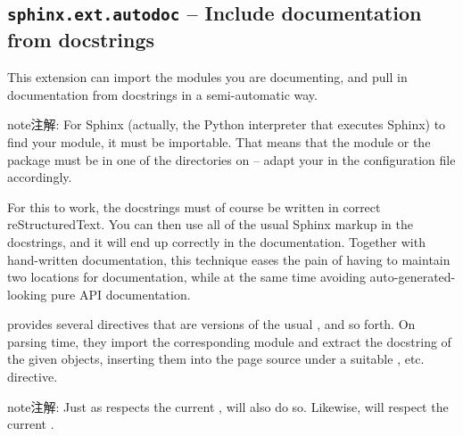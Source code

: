 \documentclass[letterpaper,10pt,english]{sphinxmanual}
\begin{document}
\subsection{\texttt{sphinx.ext.autodoc} -- Include documentation from docstrings}
\label{ext/autodoc::doc}\label{ext/autodoc:module-sphinx.ext.autodoc}\label{ext/autodoc:sphinx-ext-autodoc-include-documentation-from-docstrings}
This extension can import the modules you are documenting, and pull in
documentation from docstrings in a semi-automatic way.

\begin{notice}{note}{注解:}
For Sphinx (actually, the Python interpreter that executes Sphinx) to find
your module, it must be importable.  That means that the module or the
package must be in one of the directories on  -- adapt your
 in the configuration file accordingly.
\end{notice}

For this to work, the docstrings must of course be written in correct
reStructuredText.  You can then use all of the usual Sphinx markup in the
docstrings, and it will end up correctly in the documentation.  Together with
hand-written documentation, this technique eases the pain of having to maintain
two locations for documentation, while at the same time avoiding
auto-generated-looking pure API documentation.

 provides several directives that are versions of the usual
{\hyperref[domains:directive\string-py:module]{}}, {\hyperref[domains:directive\string-py:class]{}} and so forth.  On parsing time, they
import the corresponding module and extract the docstring of the given objects,
inserting them into the page source under a suitable {\hyperref[domains:directive\string-py:module]{}},
{\hyperref[domains:directive\string-py:class]{}} etc.  directive.

\begin{notice}{note}{注解:}
Just as {\hyperref[domains:directive\string-py:class]{}} respects the current {\hyperref[domains:directive\string-py:module]{}},
{\hyperref[ext/autodoc:directive\string-autoclass]{}} will also do so.  Likewise, {\hyperref[ext/autodoc:directive\string-automethod]{}} will
respect the current {\hyperref[domains:directive\string-py:class]{}}.
\end{notice}
\end{document}
